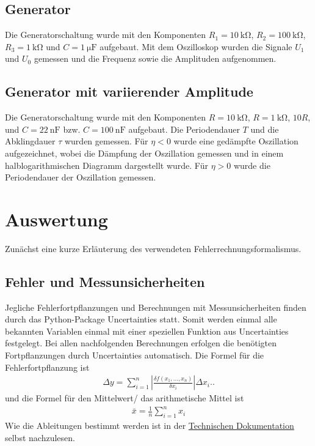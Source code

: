 \documentclass[12pt]{article}
\begin{document}
\subsection{Generator}
Die Generatorschaltung wurde mit den Komponenten \( R_1 = \SI{10}{\kilo\ohm} \), \( R_2 = \SI{100}{\kilo\ohm} \), \( R_3 = \SI{1}{\kilo\ohm} \) und \( C = \SI{1}{\micro\farad} \) aufgebaut. Mit dem Oszilloskop wurden die Signale \( U_1 \) und \( U_0 \) gemessen und die Frequenz sowie die Amplituden aufgenommen.

\subsection{Generator mit variierender Amplitude}\label{subsec:vargen}
Die Generatorschaltung wurde mit den Komponenten \( R = \SI{10}{\kilo\ohm} \), \( R = \SI{1}{\kilo\ohm} \), \( 10R \), und \( C = \SI{22}{\nano\farad} \) bzw. \( C = \SI{100}{\nano\farad} \) aufgebaut. Die Periodendauer \( T \) und die Abklingdauer \( \tau \) wurden gemessen. Für \( \eta < 0 \) wurde eine gedämpfte Oszillation aufgezeichnet, wobei die Dämpfung der Oszillation gemessen und in einem halblogarithmischen Diagramm dargestellt wurde. Für \( \eta > 0 \) wurde die Periodendauer der Oszillation gemessen.

\section{Auswertung}\label{sec:auswertung}
Zunächst eine kurze Erläuterung des verwendeten Fehlerrechnungsformalismus.
\subsection{Fehler und Messunsicherheiten}\label{subsec:fehler-und-messunsicherheiten}
Jegliche Fehlerfortpflanzungen und Berechnungen mit Messunsicherheiten finden durch das Python-Package Uncertainties\cite{uncertainties} statt.
Somit werden einmal alle bekannten Variablen einmal mit einer speziellen Funktion aus Uncertainties festgelegt.
Bei allen nachfolgenden Berechnungen erfolgen die benötigten Fortpflanzungen durch Uncertainties automatisch.
Die Formel für die Fehlerfortpflanzung ist
\begin{align}
  \Delta y=\sum_{i=1}^n\left|\frac{\delta f\left(x_1, \ldots, x_n\right)}{\delta x_i}\right| \Delta x_i.\text{.}\label{gauss}
\end{align}
und die Formel für den Mittelwert/ das arithmetische Mittel ist
\begin{align}
  \bar{x}=\frac{1}{n}\sum_{i=1}^n x_i\label{mittel}
\end{align}
Wie die Ableitungen bestimmt werden ist in der \href{https://readthedocs.org/projects/uncertainties-python-package/downloads/pdf/latest/}{Technischen Dokumentation} selbst nachzulesen.
\end{document}
